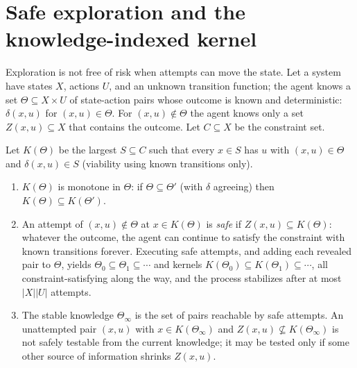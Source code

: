 \section{Safe exploration and the knowledge-indexed kernel}

Exploration is not free of risk when attempts can move the state. Let a system have states $X$, actions $U$, and an unknown transition function; the agent knows a set $\Theta\subseteq X\times U$ of state-action pairs whose outcome is known and deterministic: $\delta(x,u)$ for $(x,u)\in\Theta$. For $(x,u)\notin\Theta$ the agent knows only a set $Z(x,u)\subseteq X$ that contains the outcome. Let $C\subseteq X$ be the constraint set.

\begin{newresult}\label{thm:safe-explore}
Let $K(\Theta)$ be the largest $S\subseteq C$ such that every $x\in S$ has $u$ with $(x,u)\in\Theta$ and $\delta(x,u)\in S$ (viability using known transitions only).
\begin{enumerate}[nosep,label=(\alph*)]
  \item $K(\Theta)$ is monotone in $\Theta$: if $\Theta\subseteq\Theta'$ (with $\delta$ agreeing) then $K(\Theta)\subseteq K(\Theta')$.
  \item An attempt of $(x,u)\notin\Theta$ at $x\in K(\Theta)$ is \emph{safe} if $Z(x,u)\subseteq K(\Theta)$: whatever the outcome, the agent can continue to satisfy the constraint with known transitions forever. Executing safe attempts, and adding each revealed pair to $\Theta$, yields $\Theta_0\subseteq\Theta_1\subseteq\cdots$ and kernels $K(\Theta_0)\subseteq K(\Theta_1)\subseteq\cdots$, all constraint-satisfying along the way, and the process stabilizes after at most $|X||U|$ attempts.
  \item The stable knowledge $\Theta_\infty$ is the set of pairs reachable by safe attempts. An unattempted pair $(x,u)$ with $x\in K(\Theta_\infty)$ and $Z(x,u)\not\subseteq K(\Theta_\infty)$ is not safely testable from the current knowledge; it may be tested only if some other source of information shrinks $Z(x,u)$.
\end{enumerate}
\end{newresult}
